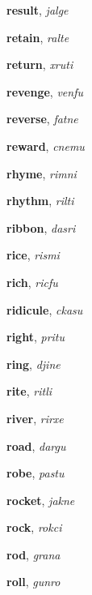\documentclass[12pt]{book}
\begin{document}
\begin{description}
\item[ ] \textbf{result}, \textit{jalge}

\item[ ] \textbf{retain}, \textit{ralte}

\item[ ] \textbf{return}, \textit{xruti}

\item[ ] \textbf{revenge}, \textit{venfu}

\item[ ] \textbf{reverse}, \textit{fatne}

\item[ ] \textbf{reward}, \textit{cnemu}

\item[ ] \textbf{rhyme}, \textit{rimni}

\item[ ] \textbf{rhythm}, \textit{rilti}

\item[ ] \textbf{ribbon}, \textit{dasri}

\item[ ] \textbf{rice}, \textit{rismi}

\item[ ] \textbf{rich}, \textit{ricfu}

\item[ ] \textbf{ridicule}, \textit{ckasu}

\item[ ] \textbf{right}, \textit{pritu}

\item[ ] \textbf{ring}, \textit{djine}

\item[ ] \textbf{rite}, \textit{ritli}

\item[ ] \textbf{river}, \textit{rirxe}

\item[ ] \textbf{road}, \textit{dargu}

\item[ ] \textbf{robe}, \textit{pastu}

\item[ ] \textbf{rocket}, \textit{jakne}

\item[ ] \textbf{rock}, \textit{rokci}

\item[ ] \textbf{rod}, \textit{grana}

\item[ ] \textbf{roll}, \textit{gunro}


\end{description}
\end{document}
